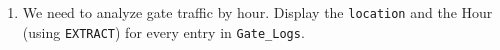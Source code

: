 \documentclass[12pt,a4paper]{article}
\begin{document}
\begin{enumerate}


\item We need to analyze gate traffic by hour. Display the \texttt{location} and the Hour (using \texttt{EXTRACT}) for every entry in \texttt{Gate\_Logs}.






\end{enumerate}
\end{document}
